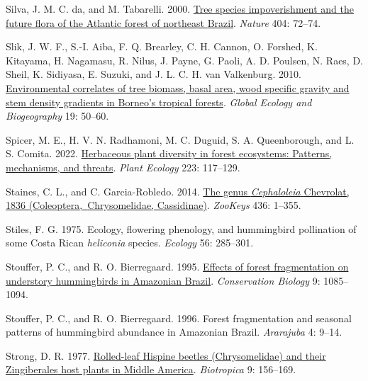 \documentclass[
  man, donotrepeattitle,floatsintext]{apa6}
\newlength{\cslhangindent}
\newlength{\cslentryspacingunit} %
\newenvironment{CSLReferences}[2] %
 {%
  \setlength{\parindent}{0pt}
  \ifodd #1
  \let\oldpar\par
  \def\par{\hangindent=\cslhangindent\oldpar}
  \fi
  \setlength{\parskip}{#2\cslentryspacingunit}
 }%
 {}
\begin{document}
\begin{CSLReferences}{1}{0}
\leavevmode{}%
Silva, J. M. C. da, and M. Tabarelli. 2000. \href{https://doi.org/10.1038/35003563}{Tree species impoverishment and the future flora of the {Atlantic} forest of northeast {Brazil}}. \emph{Nature} 404: 72--74.

\leavevmode{}%
Slik, J. W. F., S.-I. Aiba, F. Q. Brearley, C. H. Cannon, O. Forshed, K. Kitayama, H. Nagamasu, R. Nilus, J. Payne, G. Paoli, A. D. Poulsen, N. Raes, D. Sheil, K. Sidiyasa, E. Suzuki, and J. L. C. H. van Valkenburg. 2010. \href{https://doi.org/10.1111/j.1466-8238.2009.00489.x}{Environmental correlates of tree biomass, basal area, wood specific gravity and stem density gradients in {Borneo}'s tropical forests}. \emph{Global Ecology and Biogeography} 19: 50--60.

\leavevmode{}%
Spicer, M. E., H. V. N. Radhamoni, M. C. Duguid, S. A. Queenborough, and L. S. Comita. 2022. \href{https://doi.org/10.1007/s11258-021-01202-9}{Herbaceous plant diversity in forest ecosystems: Patterns, mechanisms, and threats}. \emph{Plant Ecology} 223: 117--129.

\leavevmode{}%
Staines, C. L., and C. Garcia-Robledo. 2014. \href{https://doi.org/10.3897/zookeys.436.5766}{The genus \emph{{Cephaloleia}} {Chevrolat}, 1836 ({Coleoptera},~{Chrysomelidae}, {Cassidinae})}. \emph{ZooKeys} 436: 1--355.

\leavevmode{}%
Stiles, F. G. 1975. Ecology, flowering phenology, and hummingbird pollination of some {Costa} {Rican} \emph{heliconia} species. \emph{Ecology} 56: 285--301.

\leavevmode{}%
Stouffer, P. C., and R. O. Bierregaard. 1995. \href{https://www.jstor.org/stable/2387046}{Effects of forest fragmentation on understory hummingbirds in {Amazonian} {Brazil}}. \emph{Conservation Biology} 9: 1085--1094.

\leavevmode{}%
Stouffer, P. C., and R. O. Bierregaard. 1996. Forest fragmentation and seasonal patterns of hummingbird abundance in {Amazonian} {Brazil}. \emph{Ararajuba} 4: 9--14.

\leavevmode{}%
Strong, D. R. 1977. \href{https://doi.org/10.2307/2387878}{Rolled-leaf {Hispine} beetles ({Chrysomelidae}) and their {Zingiberales} host plants in {Middle} {America}}. \emph{Biotropica} 9: 156--169.


\end{CSLReferences}
\end{document}
